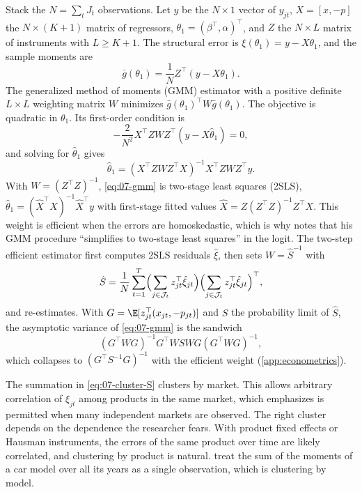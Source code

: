 Stack the $N = \sum_t J_t$ observations. Let $y$ be the $N \times 1$ vector of $y_{jt}$, $X = [x, -p]$ the $N \times
(K+1)$ matrix of regressors, $\theta_1 = (\beta^\top, \alpha)^\top$, and $Z$ the $N \times L$ matrix of instruments
with $L \ge K + 1$. The structural error is $\xi(\theta_1) = y - X\theta_1$, and the sample moments are
\begin{equation*}
  \bar g(\theta_1) = \frac{1}{N}Z^\top(y - X\theta_1).
\end{equation*}
The generalized method of moments (GMM) estimator with a positive definite $L \times L$ weighting matrix $W$ minimizes
$\bar g(\theta_1)^\top W \bar g(\theta_1)$. The objective is quadratic in $\theta_1$. Its first-order condition is
\begin{equation*}
  -\frac{2}{N^2}X^\top Z W Z^\top (y - X\hat\theta_1) = 0 ,
\end{equation*}
and solving for $\hat\theta_1$ gives
\begin{equation}\label{eq:07-gmm}
  \hat\theta_1 = (X^\top Z W Z^\top X)^{-1} X^\top Z W Z^\top y .
\end{equation}
With $W = (Z^\top Z)^{-1}$, \eqref{eq:07-gmm} is two-stage least squares (2SLS), $\hat\theta_1 = (\hat X^\top
X)^{-1}\hat X^\top y$ with first-stage fitted values $\hat X = Z(Z^\top Z)^{-1}Z^\top X$. This weight is efficient
when the errors are homoskedastic, which is why \citet[p.~319]{Nevo2001} notes that his GMM procedure ``simplifies to
two-stage least squares'' in the logit. The two-step efficient estimator first computes 2SLS residuals $\hat\xi$, then
sets $W = \hat S^{-1}$ with
\begin{equation}\label{eq:07-cluster-S}
  \hat S = \frac{1}{N}\sum_{t=1}^T \Bigl(\sum_{j \in \mathcal{J}_t} z_{jt}^\top\hat\xi_{jt}\Bigr)
  \Bigl(\sum_{j \in \mathcal{J}_t} z_{jt}^\top\hat\xi_{jt}\Bigr)^\top ,
\end{equation}
and re-estimates. With $G = \E[z_{jt}^\top(x_{jt}, -p_{jt})]$ and $S$ the probability limit of $\hat S$, the asymptotic
variance of \eqref{eq:07-gmm} is the sandwich
\begin{equation*}
  (G^\top W G)^{-1}G^\top W S W G(G^\top W G)^{-1},
\end{equation*}
which collapses to $(G^\top S^{-1} G)^{-1}$ with the efficient weight (\cref{app:econometrics}).

The summation in \eqref{eq:07-cluster-S} clusters by market. This allows arbitrary correlation of $\xi_{jt}$ among
products in the same market, which \citet[p.~250]{Berry1994} emphasizes is permitted when many independent markets
are observed. The right cluster depends on the dependence the researcher fears. With product fixed effects or Hausman
instruments, the errors of the same product over time are likely correlated, and clustering by product is natural.
\citet[p.~862]{BerryLevinsohnPakes1995} treat the sum of the moments of a car model over all its years as a single
observation, which is clustering by model.

